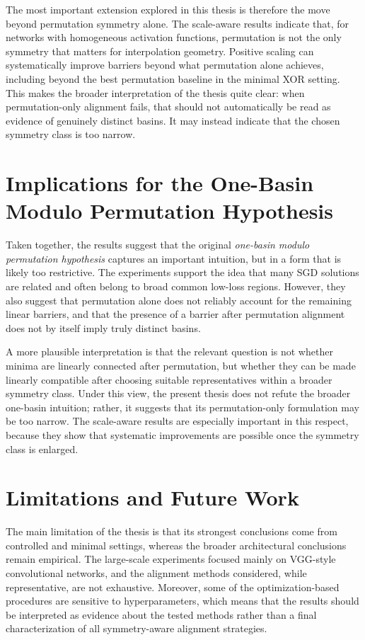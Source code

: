 \documentclass[11pt,a4paper]{report}
\begin{document}
The most important extension explored in this thesis is therefore the move beyond permutation symmetry alone. The scale-aware results indicate that, for networks with homogeneous activation functions, permutation is not the only symmetry that matters for interpolation geometry. Positive scaling can systematically improve barriers beyond what permutation alone achieves, including beyond the best permutation baseline in the minimal XOR setting. This makes the broader interpretation of the thesis quite clear: when permutation-only alignment fails, that should not automatically be read as evidence of genuinely distinct basins. It may instead indicate that the chosen symmetry class is too narrow.

\section{Implications for the One-Basin Modulo Permutation Hypothesis}

Taken together, the results suggest that the original \textit{one-basin modulo permutation hypothesis} captures an important intuition, but in a form that is likely too restrictive. The experiments support the idea that many SGD solutions are related and often belong to broad common low-loss regions. However, they also suggest that permutation alone does not reliably account for the remaining linear barriers, and that the presence of a barrier after permutation alignment does not by itself imply truly distinct basins.

A more plausible interpretation is that the relevant question is not whether minima are linearly connected after permutation, but whether they can be made linearly compatible after choosing suitable representatives within a broader symmetry class. Under this view, the present thesis does not refute the broader one-basin intuition; rather, it suggests that its permutation-only formulation may be too narrow. The scale-aware results are especially important in this respect, because they show that systematic improvements are possible once the symmetry class is enlarged.

\section{Limitations and Future Work}

The main limitation of the thesis is that its strongest conclusions come from controlled and minimal settings, whereas the broader architectural conclusions remain empirical. The large-scale experiments focused mainly on VGG-style convolutional networks, and the alignment methods considered, while representative, are not exhaustive. Moreover, some of the optimization-based procedures are sensitive to hyperparameters, which means that the results should be interpreted as evidence about the tested methods rather than a final characterization of all symmetry-aware alignment strategies.
\end{document}
